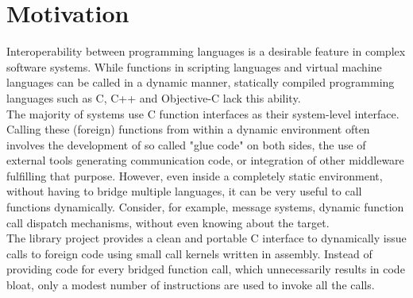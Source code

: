 %
%
%
%

\clearpage
\section{Motivation}

Interoperability between programming languages is a desirable feature 
in complex software systems. While functions in scripting languages and virtual machine
languages can be called in a dynamic manner, statically compiled programming
languages such as C, C++ and Objective-C lack this ability.\\
The majority of systems use C function interfaces as their system-level 
interface. Calling these (foreign) functions from within a dynamic environment 
often involves the development of so called "glue code" on both sides,
the use of external tools generating communication code, or integration
of other middleware fulfilling that purpose. However, even inside a completely
static environment, without having to bridge multiple languages, it
can be very useful to call functions dynamically. Consider, for example, message 
systems, dynamic function call dispatch mechanisms, without even knowing about the 
target.\\

The  library project provides a clean and portable C interface
to dynamically issue calls to foreign code using small call kernels written in
assembly. Instead of providing code for every bridged function call, which
unnecessarily results in code bloat, only a modest number of instructions are used
to invoke all the calls.\\

